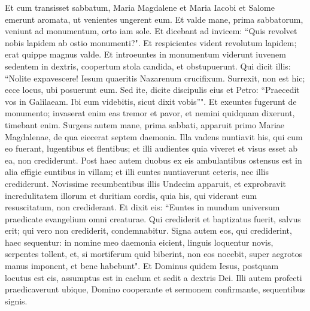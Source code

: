 \begin{biblechapter}  
\verse Et cum transisset sabbatum, Maria Magdalene et Maria Iacobi et Salome emerunt aromata, ut venientes ungerent eum. 
\verse Et valde mane, prima sabbatorum, veniunt ad monumentum, orto iam sole. 
\verse Et dicebant ad invicem: “Quis revolvet nobis lapidem ab ostio monumenti?". 
\verse Et respicientes vident revolutum lapidem; erat quippe magnus valde. 
\verse Et introeuntes in monumentum viderunt iuvenem sedentem in dextris, coopertum stola candida, et obstupuerunt. 
\verse Qui dicit illis: “Nolite expavescere! Iesum quaeritis Nazarenum crucifixum. Surrexit, non est hic; ecce locus, ubi posuerunt eum. 
\verse Sed ite, dicite discipulis eius et Petro: “Praecedit vos in Galilaeam. Ibi eum videbitis, sicut dixit vobis”". 
\verse Et exeuntes fugerunt de monumento; invaserat enim eas tremor et pavor, et nemini quidquam dixerunt, timebant enim. 
\verse Surgens autem mane, prima sabbati, apparuit primo Mariae Magdalenae, de qua eiecerat septem daemonia. 
\verse Illa vadens nuntiavit his, qui cum eo fuerant, lugentibus et flentibus; 
\verse et illi audientes quia viveret et visus esset ab ea, non crediderunt. 
\verse Post haec autem duobus ex eis ambulantibus ostensus est in alia effigie euntibus in villam; 
\verse et illi euntes nuntiaverunt ceteris, nec illis crediderunt. 
\verse Novissime recumbentibus illis Undecim apparuit, et exprobravit incredulitatem illorum et duritiam cordis, quia his, qui viderant eum resuscitatum, non crediderant. 
\verse Et dixit eis: “Euntes in mundum universum praedicate evangelium omni creaturae. 
\verse Qui crediderit et baptizatus fuerit, salvus erit; qui vero non crediderit, condemnabitur. 
\verse Signa autem eos, qui crediderint, haec sequentur: in nomine meo daemonia eicient, linguis loquentur novis, 
\verse serpentes tollent, et, si mortiferum quid biberint, non eos nocebit, super aegrotos manus imponent, et bene habebunt". 
\verse Et Dominus quidem Iesus, postquam locutus est eis, assumptus est in caelum et sedit a dextris Dei. 
\verse Illi autem profecti praedicaverunt ubique, Domino cooperante et sermonem confirmante, sequentibus signis.
\end{biblechapter}
